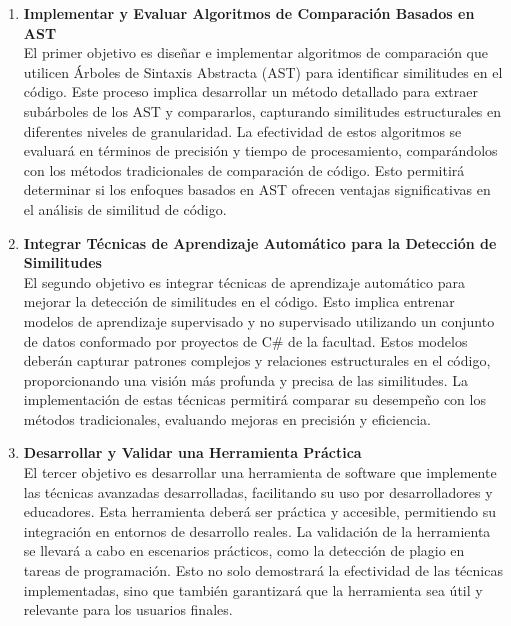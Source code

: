 \renewcommand{\labelenumi}{\Roman{enumi}.}
\begin{enumerate}
	\item {\bf Implementar y Evaluar Algoritmos de Comparación Basados en AST}\\
	El primer objetivo es diseñar e implementar algoritmos de comparación que utilicen Árboles de Sintaxis Abstracta (AST) para identificar similitudes en el código. Este proceso implica desarrollar un método detallado para extraer subárboles de los AST y compararlos, capturando similitudes estructurales en diferentes niveles de granularidad. La efectividad de estos algoritmos se evaluará en términos de precisión y tiempo de procesamiento, comparándolos con los métodos tradicionales de comparación de código. Esto permitirá determinar si los enfoques basados en AST ofrecen ventajas significativas en el análisis de similitud de código.
	
	\item {\bf Integrar Técnicas de Aprendizaje Automático para la Detección de Similitudes} \\
El segundo objetivo es integrar técnicas de aprendizaje automático para mejorar la detección de similitudes en el código. Esto implica entrenar modelos de aprendizaje supervisado y no supervisado utilizando un conjunto de datos conformado por proyectos de C\# de la facultad. Estos modelos deberán capturar patrones complejos y relaciones estructurales en el código, proporcionando una visión más profunda y precisa de las similitudes. La implementación de estas técnicas permitirá comparar su desempeño con los métodos tradicionales, evaluando mejoras en precisión y eficiencia.

	\item {\bf Desarrollar y Validar una Herramienta Práctica} \\
El tercer objetivo es desarrollar una herramienta de software que implemente las técnicas avanzadas desarrolladas, facilitando su uso por desarrolladores y educadores. Esta herramienta deberá ser práctica y accesible, permitiendo su integración en entornos de desarrollo reales. La validación de la herramienta se llevará a cabo en escenarios prácticos, como la detección de plagio en tareas de programación. Esto no solo demostrará la efectividad de las técnicas implementadas, sino que también garantizará que la herramienta sea útil y relevante para los usuarios finales.


\end{enumerate}
